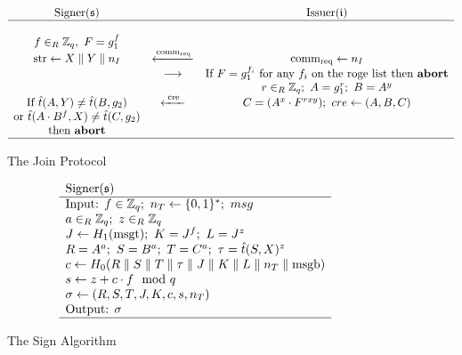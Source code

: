 \begin{figure}[H]
$$
\begin{array}{ccc}
    \text{Signer}(\mathfrak{s}) &    & \text{Issuer}(\mathfrak{i}) \\
    \hline
    \\
    f \in_R {\mathbb Z}_q, \ F = g_1^f &    &    \\
    \text{str} \leftarrow X \parallel Y \parallel n_I &  \xleftarrow{\text{comm}_{\text{req}}} & \text{comm}_{\text{req}} \leftarrow n_I \\
        & \longrightarrow & \text{If } F = g_1^{f_i} \text{ for any } f_i \text{ on the roge list then \textbf{abort}} \\
        &        & r\in_R {\mathbb Z}_q; \ A = g_1^r; \ B = A^y \\
    \text{If } \hat{t}(A,Y) \neq \hat{t}(B,g_2) & \xleftarrow{\text{  cre  }} & C = (A^x \cdot F^{rxy}); \ cre \leftarrow(A,B,C) \\
    \text{or } \hat{t}(A \cdot B^f , X) \neq \hat{t}(C,g_2) &    & \\
    \text{then \textbf{abort}} &    & \\
    \hline
\end{array} 
$$
\caption{The Join Protocol}
\label{fig:join}
\end{figure}

\begin{figure}[H]
$$\begin{array}{l}
\text{Signer}(\mathfrak{s}) \\
\hline
\text{Input: } f \in {\mathbb Z}_q; \ n_T \leftarrow \{0,1\}^\ast; \ msg \\
a \in_R {\mathbb Z}_q; \ z \in_R {\mathbb Z}_q \\
J \leftarrow H_1(\text{msgt}); \ K = J^f; \ L = J^z \\
R = A^a; \ S = B^a; \ T = C^a; \ \tau = \hat{t}(S,X)^z \\
c \leftarrow H_0(R \parallel S \parallel T \parallel \tau \parallel J \parallel K \parallel L \parallel n_T \parallel \text{msgb}) \\
s \leftarrow z + c \cdot f \mod q \\
\sigma \leftarrow (R,S,T,J,K,c,s,n_T) \\
\text{Output: } \sigma \\
\hline
\end{array}
$$
\caption{The Sign Algorithm}
\label{fig:sign}
\end{figure}

